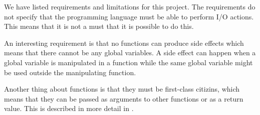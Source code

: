 We have listed requirements and limitations for this project. The requirements do not specify that the programming language must be able to perform I/O actions. This means that it is not a must that it is possible to do this.

An interesting requirement is that no functions can produce side effects which means that there cannot be any global variables. A side effect can happen when a global variable is manipulated in a function while the same global variable might be used outside the manipulating function. 

Another thing about functions is that they must be first-class citizins, which means that they can be passed as arguments to other functions or as a return value. This is described in more detail in .
